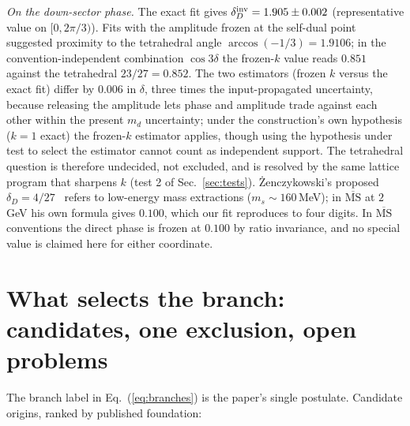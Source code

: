 \documentclass[11pt]{article}
\newcommand{\ms}{\overline{\mathrm{MS}}}
\begin{document}
\emph{On the down-sector phase.} The exact fit gives
$\delta_D^{\rm inv} = 1.905\pm0.002$ (representative value on $[0,2\pi/3)$).
Fits with the amplitude frozen at the self-dual point suggested proximity to the tetrahedral angle $\arccos(-1/3)=1.9106$; in the convention-independent combination $\cos 3\delta$ the frozen-$k$ value reads $0.851$ against the tetrahedral $23/27 = 0.852$. The two estimators (frozen $k$ versus the exact fit) differ by $0.006$ in $\delta$, three times the input-propagated uncertainty, because releasing the amplitude lets phase and amplitude trade against each other within the present $m_d$ uncertainty; under the construction's own hypothesis ($k=1$ exact) the frozen-$k$ estimator applies, though using the hypothesis under test to select the estimator cannot count as independent support. The tetrahedral question is therefore undecided, not excluded, and is resolved by the same lattice program that sharpens $k$ (test 2 of Sec.~\ref{sec:tests}).
\.{Z}enczykowski's proposed $\delta_D = 4/27$~\cite{Zen2012,Zen2013} refers to
low-energy mass extractions ($m_s \sim 160$\,MeV); in $\ms$ at $2$\,GeV his own
formula gives $0.100$, which our fit reproduces to four digits. In $\ms$
conventions the direct phase is frozen at $0.100$ by ratio invariance, and no
special value is claimed here for either coordinate.

\section{What selects the branch: candidates, one exclusion, open problems}
\label{sec:open}

The branch label in Eq.~(\ref{eq:branches}) is the paper's single postulate.
Candidate origins, ranked by published foundation:
\end{document}

